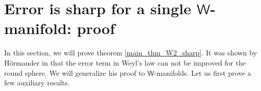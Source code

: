 \documentclass[11pt,lettersize,reqno,fullpage]{amsart}
\newtheorem{thm}{Theorem}[section]
\begin{document}


\section{Error is sharp for a single $\mathsf{W}$-manifold: proof} 
\label{Error_is_sharp}
In this section, we will prove theorem \ref{main_thm_W2_sharp}.
It was shown by H{\"o}rmander in \cite{LH} that the error term in Weyl's law can not 
be improved for the round sphere.  
We will generalize his proof to $\mathsf{W}$-manifolds. 
Let us first prove a few auxiliary results.  
%
\end{document}
